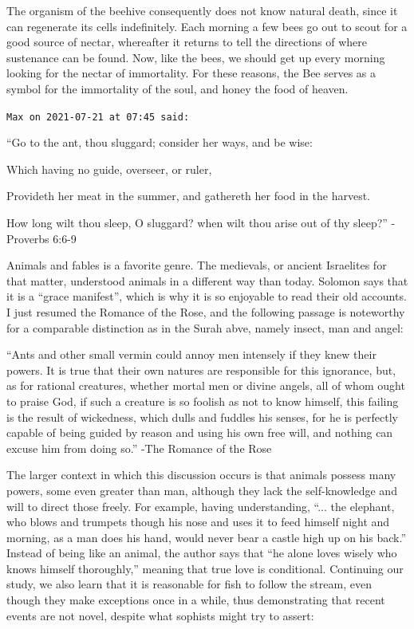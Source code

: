 \begin{footnotesize}
\begin{sffamily}
The organism of the beehive consequently does not know natural death, since it can regenerate its cells indefinitely. Each morning a few bees go out to scout for a good source of nectar, whereafter it returns to tell the directions of where sustenance can be found. Now, like the bees, we should get up every morning looking for the nectar of immortality. For these reasons, the Bee serves as a symbol for the immortality of the soul, and honey the food of heaven.

\hfill

\texttt{Max on 2021-07-21 at 07:45 said:}

``Go to the ant, thou sluggard; consider her ways, and be wise:

Which having no guide, overseer, or ruler,

Provideth her meat in the summer, and gathereth her food in the harvest.

How long wilt thou sleep, O sluggard? when wilt thou arise out of thy sleep?'' -Proverbs 6:6-9

Animals and fables is a favorite genre. The medievals, or ancient Israelites for that matter, understood animals in a different way than today. Solomon says that it is a ``grace manifest'', which is why it is so enjoyable to read their old accounts. I just resumed the Romance of the Rose, and the following passage is noteworthy for a comparable distinction as in the Surah abve, namely insect, man and angel:

``Ants and other small vermin could annoy men intensely if they knew their powers. It is true that their own natures are responsible for this ignorance, but, as for rational creatures, whether mortal men or divine angels, all of whom ought to praise God, if such a creature is so foolish as not to know himself, this failing is the result of wickedness, which dulls and fuddles his senses, for he is perfectly capable of being guided by reason and using his own free will, and nothing can excuse him from doing so.'' -The Romance of the Rose

The larger context in which this discussion occurs is that animals possess many powers, some even greater than man, although they lack the self-knowledge and will to direct those freely. For example, having understanding, ``... the elephant, who blows and trumpets though his nose and uses it to feed himself night and morning, as a man does his hand, would never bear a castle high up on his back.'' Instead of being like an animal, the author says that ``he alone loves wisely who knows himself thoroughly,'' meaning that true love is conditional. Continuing our study, we also learn that it is reasonable for fish to follow the stream, even though they make exceptions once in a while, thus demonstrating that recent events are not novel, despite what sophists might try to assert:


\end{sffamily}
\end{footnotesize}
